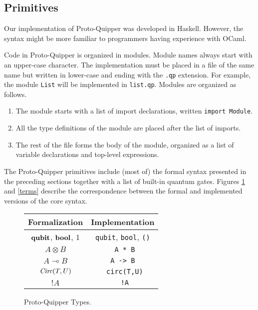 \subsection{Primitives}

Our implementation of Proto-Quipper was developed in Haskell. However, the 
syntax might be more familiar to programmers having experience with OCaml.

Code in Proto-Quipper is organized in modules. Module names always start 
with an upper-case character. The implementation must be placed in a file 
of the same name but written in lower-case and ending with the {\tt.qp} 
extension. For example, the module {\tt List} will be implemented in 
{\tt list.qp}. Modules are organized as follows.
\begin{enumerate}
  \item The module starts with a list of import declarations, written 
  {\tt import Module}.
  \item All the type definitions of the module are placed after the list 
  of imports.
  \item The rest of the file forms the body of the module, organized as a 
  list of variable declarations and top-level expressions.
\end{enumerate}

The Proto-Quipper primitives include (most of) the formal syntax presented 
in the preceding sections together with a list of built-in quantum gates. 
Figures \hyperref[types]{\ref*{types}} and \hyperref[terms]{\ref*{terms}} 
describe the correspondence between the formal and implemented versions of 
the core syntax.

\begin{figure}[!ht]
\begin{center}
\renewcommand{\arraystretch}{1.4}
\begin{tabular}{|c|c|}
  \hline
  \textbf{Formalization}    & \textbf{Implementation} \\\hline
  $\textrm{\bf qubit}$, $\textrm{\bf bool}$, $1$    & \verb#qubit#, \verb#bool#, \verb#()# \\\hline
  $A \otimes B$             & \verb# A * B# \\\hline
  $A \multimap B$           & \verb# A -> B # \\\hline
  $\mathop{\textit{Circ}}\nolimits(T, U)$              & \verb# circ(T,U)# \\\hline
  ${!} A$                   & \verb# !A# \\\hline
\end{tabular}
\end{center}
\caption{Proto-Quipper Types.}
\label{types}
\end{figure}

